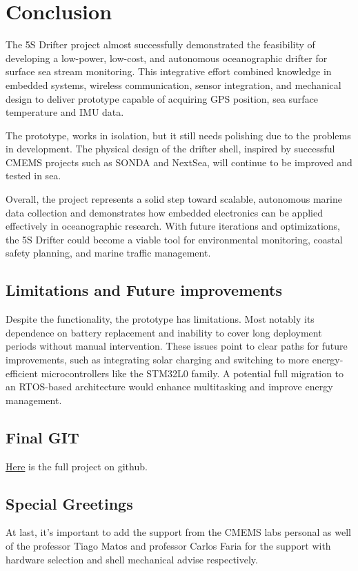 \chapter{Conclusion}

The 5S Drifter project almost successfully demonstrated the feasibility of developing a low-power, low-cost, 
and autonomous oceanographic drifter for surface sea stream monitoring. This integrative effort combined
knowledge in embedded systems, wireless communication, sensor integration, and mechanical design to
deliver prototype capable of acquiring GPS position, sea surface temperature and IMU data.

The prototype, works in isolation, but it still needs polishing due to the problems in development.
The physical design of the drifter shell, inspired by successful CMEMS projects such as SONDA and NextSea,
will continue to be improved and tested in sea. 

Overall, the project represents a solid step toward scalable, autonomous marine data collection and 
demonstrates how embedded electronics can be applied effectively in oceanographic research. With future 
iterations and optimizations, the 5S Drifter could become a viable tool for environmental monitoring, 
coastal safety planning, and marine traffic management.


\section{Limitations and Future improvements}
Despite the functionality, the prototype has limitations. Most notably its dependence on battery replacement 
and inability to cover long deployment periods without manual intervention. These issues point to clear 
paths for future improvements, such as integrating solar charging and switching to more energy-efficient 
microcontrollers like the STM32L0 family. A potential full migration to an RTOS-based architecture would 
enhance multitasking and improve energy management.

\section{Final GIT}
\href{https://github.com/viniciuscacarvalho/5S}{Here} is the full project on github.

\section{Special Greetings}
At last, it's important to add the support from the 
CMEMS labs personal as well of the professor Tiago Matos and professor Carlos Faria for the
support with hardware selection and shell mechanical advise respectively.

